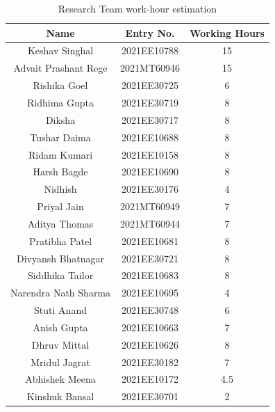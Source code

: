 \documentclass[12pt]{article} %
\begin{document}
\begin{table}[h]
\centering
\begin{tabular}{|c|c|c|}
\hline
Name & Entry No. & Working Hours \\
\hline
Keshav Singhal & 2021EE10788 & 15 \\
Advait Prashant Rege & 2021MT60946 & 15 \\
Rishika Goel & 2021EE30725 & 6 \\
Ridhima Gupta & 2021EE30719 & 8 \\
Diksha & 2021EE30717 & 8 \\
Tushar Daima & 2021EE10688 & 8 \\
Ridam Kumari & 2021EE10158 & 8 \\
Harsh Bagde & 2021EE10690 & 8 \\
Nidhish & 2021EE30176 & 4 \\
Priyal Jain & 2021MT60949 & 7 \\
Aditya Thomas & 2021MT60944 & 7 \\
Pratibha Patel & 2021EE10681 & 8 \\
Divyansh Bhatnagar & 2021EE30721 & 8 \\
Siddhika Tailor & 2021EE10683 & 8 \\
Narendra Nath Sharma & 2021EE10695 & 4 \\
Stuti Anand & 2021EE30748 & 6 \\
Anish Gupta & 2021EE10663 & 7 \\
Dhruv Mittal & 2021EE10626 & 8 \\
Mridul Jagrat & 2021EE30182 & 7 \\
Abhishek Meena & 2021EE10172 & 4.5 \\
Kinshuk Bansal & 2021EE30701 & 2 \\
\hline
\end{tabular}
\caption{Research Team work-hour estimation}
\label{tab:teamDetails}
\end{table}
\end{document}

